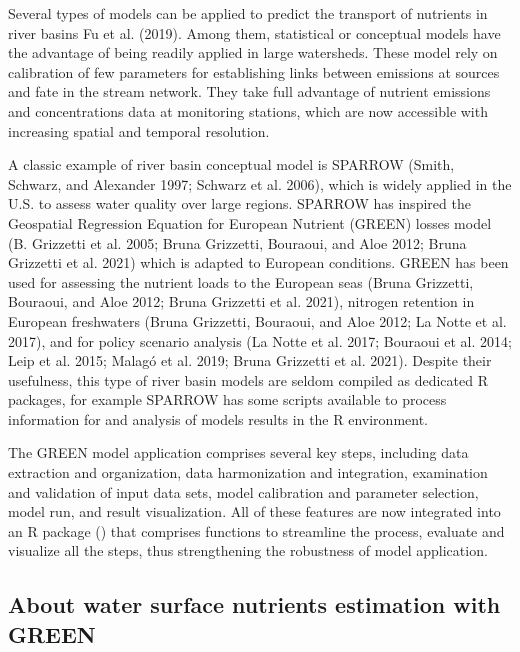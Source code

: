 Several types of models can be applied to predict the transport of nutrients in river basins Fu et al. (2019). Among them, statistical or conceptual models have the advantage of being readily applied in large watersheds. These model rely on calibration of few parameters for establishing links between emissions at sources and fate in the stream network. They take full advantage of nutrient emissions and concentrations data at monitoring stations, which are now accessible with increasing spatial and temporal resolution.

A classic example of river basin conceptual model is SPARROW (Smith, Schwarz, and Alexander 1997; Schwarz et al. 2006), which is widely applied in the U.S. to assess water quality over large regions. SPARROW has inspired the Geospatial Regression Equation for European Nutrient (GREEN) losses model (B. Grizzetti et al. 2005; Bruna Grizzetti, Bouraoui, and Aloe 2012; Bruna Grizzetti et al. 2021) which is adapted to European conditions. GREEN has been used for assessing the nutrient loads to the European seas (Bruna Grizzetti, Bouraoui, and Aloe 2012; Bruna Grizzetti et al. 2021), nitrogen retention in European freshwaters (Bruna Grizzetti, Bouraoui, and Aloe 2012; La Notte et al. 2017), and for policy scenario analysis (La Notte et al. 2017; Bouraoui et al. 2014; Leip et al. 2015; Malagó et al. 2019; Bruna Grizzetti et al. 2021). Despite their usefulness, this type of river basin models are seldom compiled as dedicated R packages, for example SPARROW has some scripts available to process information for and analysis of models results in the R environment.

The GREEN model application comprises several key steps, including data extraction and organization, data harmonization and integration, examination and validation of input data sets, model calibration and parameter selection, model run, and result visualization. All of these features are now integrated into an R package () that comprises functions to streamline the process, evaluate and visualize all the steps, thus strengthening the robustness of model application.

\hypertarget{about-water-surface-nutrients-estimation-with-green}{%
\subsection{About water surface nutrients estimation with GREEN}\label{about-water-surface-nutrients-estimation-with-green}}

